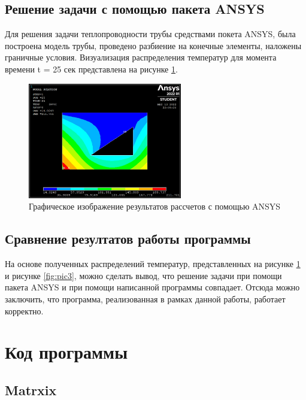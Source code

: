 \documentclass[12pt, a4paper]{article}
\begin{document}
    \subsection{Решение задачи с помощью пакета ANSYS}
    Для решения задачи теплопроводности трубы средствами покета ANSYS, была построена модель трубы, проведено разбиение на конечные элементы, наложены граничные условия. Визуализация распределения температур для момента времени t = 25 сек представлена на рисунке \ref{fig:pic4}.
    
    \begin{figure}[h]
    	\centering    %
    	\includegraphics[width=0.6\textwidth]{static/AnsysResult.jpg}
    	\caption{Графическое изображение результатов рассчетов с помощью ANSYS} %
    	\label{fig:pic4} %
    \end{figure}

    \subsection{Сравнение резултатов работы программы}
    На основе полученных распределений температур, представленных на рисунке \ref{fig:pic4} и рисунке \ref{fig:pic3}, можно сделать вывод, что решение задачи при помощи пакета ANSYS и при помощи написанной программы совпадает. Отсюда можно заключить, что программа, реализованная в рамках данной работы, работает корректно.
	
	\section{Код программы}
	
	\subsection{Matrxix}
	
	
\end{document}
